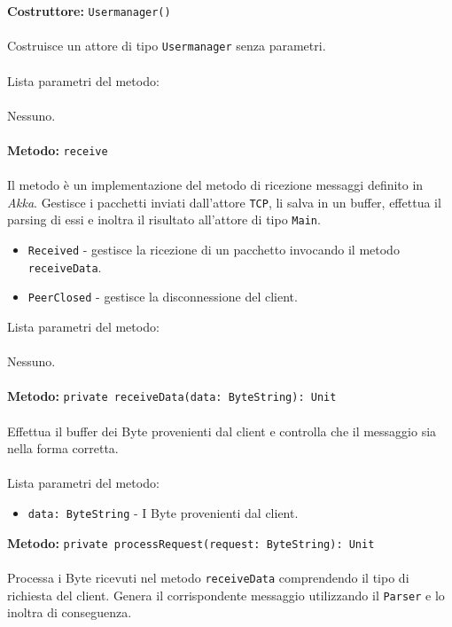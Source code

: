 \documentclass[a4paper]{article}
\begin{document}
		\textbf{Costruttore: }\texttt{Usermanager()}
			\\ \\
			Costruisce un attore di tipo \texttt{Usermanager} senza parametri.
			\\ \\
			Lista parametri del metodo:
			\\ \\
			Nessuno.
			\\ \\
		\textbf{Metodo: }\texttt{receive}
			\\ \\
			Il metodo è un implementazione del metodo di ricezione messaggi definito in \emph{Akka}. Gestisce i pacchetti inviati dall'attore \texttt{TCP}, li salva in un buffer, effettua il parsing di essi e inoltra il risultato all'attore di tipo \texttt{Main}.
			\begin{itemize}
				\item \texttt{Received} - gestisce la ricezione di un pacchetto invocando il metodo \texttt{receiveData}.
				\item \texttt{PeerClosed} - gestisce la disconnessione del client.
			\end{itemize}
			Lista parametri del metodo:
			\\ \\
			Nessuno.
			\\ \\
		\textbf{Metodo: }\texttt{private receiveData(data: ByteString): Unit}
			\\ \\
			Effettua il  buffer dei Byte provenienti dal client e controlla che il messaggio sia nella forma corretta.
			\\ \\
			Lista parametri del metodo:
			\begin{itemize}
				\item \texttt{data: ByteString} - I Byte provenienti dal client.
			\end{itemize}
		\textbf{Metodo: }\texttt{private processRequest(request: ByteString): Unit}
			\\ \\
			Processa i Byte ricevuti nel metodo \texttt{receiveData} comprendendo il tipo di richiesta del client. Genera il corrispondente messaggio utilizzando il \texttt{Parser} e lo inoltra di conseguenza.
			\\ \\
\end{document}

